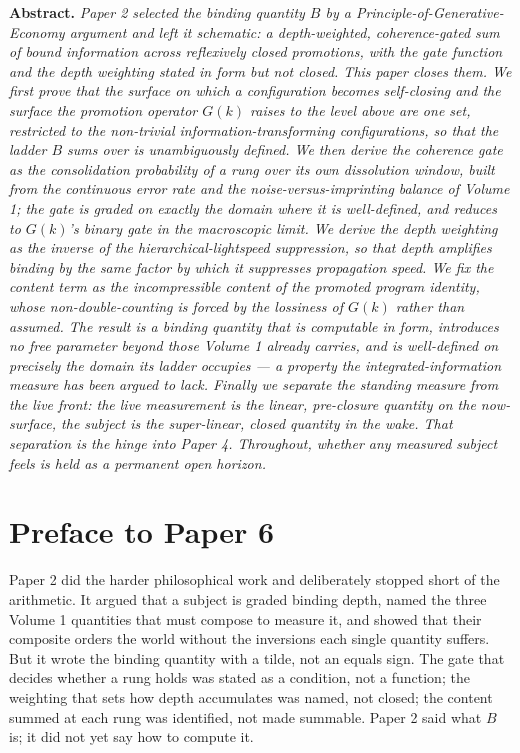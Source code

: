 \documentclass[11pt,oneside]{report}
\theoremstyle{definition}
\theoremstyle{remark}
\newenvironment{paperabstract}
  {\begin{center}\begin{minipage}{0.88\textwidth}\small
   \noindent\textbf{Abstract.}\itshape\space}
  {\end{minipage}\end{center}\vspace{0.4em}}
\begin{document}
\begin{paperabstract}
Paper 2 selected the binding quantity \ensuremath{B} by a
Principle-of-Generative-Economy argument and left it schematic: a
depth-weighted, coherence-gated sum of bound information across reflexively
closed promotions, with the gate function and the depth weighting stated in
form but not closed. This paper closes them. We first prove that the surface
on which a configuration becomes self-closing and the surface the promotion
operator \ensuremath{G(k)} raises to the level above are one set, restricted
to the non-trivial information-transforming configurations, so that the
ladder \ensuremath{B} sums over is unambiguously defined. We then derive the
coherence gate as the consolidation probability of a rung over its own
dissolution window, built from the continuous error rate and the
noise-versus-imprinting balance of Volume 1; the gate is graded on exactly
the domain where it is well-defined, and reduces to \ensuremath{G(k)}'s
binary gate in the macroscopic limit. We derive the depth weighting as the
inverse of the hierarchical-lightspeed suppression, so that depth amplifies
binding by the same factor by which it suppresses propagation speed. We fix
the content term as the incompressible content of the promoted program
identity, whose non-double-counting is forced by the lossiness of
\ensuremath{G(k)} rather than assumed. The result is a binding quantity that
is computable in form, introduces no free parameter beyond those Volume 1
already carries, and is well-defined on precisely the domain its ladder
occupies --- a property the integrated-information measure has been argued to
lack. Finally we separate the standing measure from the live front:
the live measurement is the linear, pre-closure quantity on the now-surface, the
subject is the super-linear, closed quantity in the wake. That separation is
the hinge into Paper 4. Throughout, whether any measured subject feels is
held as a permanent open horizon.
\end{paperabstract}

\section*{Preface to Paper 6}

Paper 2 did the harder philosophical work and deliberately stopped short of
the arithmetic. It argued that a subject is graded binding depth, named the
three Volume 1 quantities that must compose to measure it, and showed that
their composite orders the world without the inversions each single quantity
suffers. But it wrote the binding quantity with a tilde, not an equals sign.
The gate that decides whether a rung holds was stated as a condition, not a
function; the weighting that sets how depth accumulates was named, not
closed; the content summed at each rung was identified, not made summable.
Paper 2 said what \ensuremath{B} is; it did not yet say how to compute it.
\end{document}
